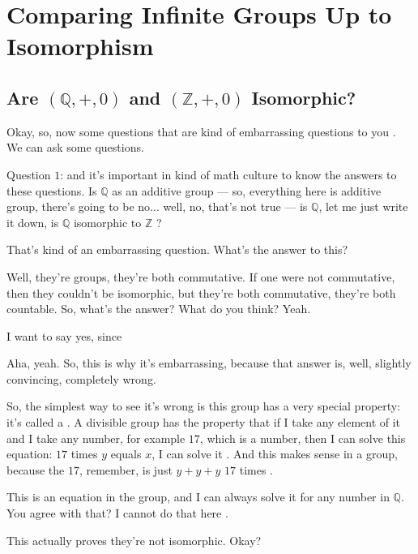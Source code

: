 \section{Comparing Infinite Groups Up to Isomorphism}

\subsection{Are \texorpdfstring{$(\mathbb{Q}, +, 0)$}{(Q, +, 0)} and \texorpdfstring{$(\mathbb{Z}, +, 0)$}{(Z, +, 0)} Isomorphic?}

\begin{speech}[00:30:40 - 00:31:44]
Okay, so, now some questions that are kind of embarrassing questions to you . We can ask some questions.

Question $1$: and it's important in kind of math culture to know the answers to these questions. Is $\mathbb{Q}$ as an additive group --- so, everything here is additive group, there's going to be no... well, no, that's not true --- is $\mathbb{Q}$, let me just write it down, is $\mathbb{Q}$ isomorphic to $\mathbb{Z}$ ?

That's kind of an embarrassing question. What's the answer to this? 

Well, they're groups, they're both commutative. If one were not commutative, then they couldn't be isomorphic, but they're both commutative, they're both countable. So, what's the answer? What do you think? Yeah.
\end{speech}

\begin{student}
I want to say yes, since 
\end{student}

\begin{speech}[00:31:47 - 00:32:43]
Aha, yeah. So, this is why it's embarrassing, because that answer is, well, slightly convincing, completely wrong.

So, the simplest way to see it's wrong is this group has a very special property: it's called a  . A divisible group has the property that if I take any element of it and I take any number, for example $17$, which is a number, then I can solve this equation: $17$ times $y$ equals $x$, I can solve it . And this makes sense in a group, because the $17$, remember, is just $y + y + y$ $17$ times .

This is an equation in the group, and I can always solve it for any number in $\mathbb{Q}$. You agree with that? I cannot do that here .

This actually proves they're not isomorphic. Okay? 
\end{speech}

